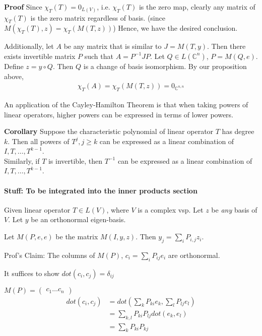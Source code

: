 \documentclass{article}
\begin{document}
\textbf{Proof} Since $\chi_T(T)=0_{L(V)}$, i.e. $\chi_T(T)$ is the zero map, clearly any matrix of $\chi_T(T)$ is the zero matrix regardless of basis. (since $M(\chi_T(T), z) = \chi_T(M(T, z))$) Hence, we have the desired conclusion.

Additionally, let $A$ be any matrix that is similar to $J=M(T, y)$. Then there exists invertible matrix $P$ such that $A=P^{-1}JP$. Let $Q\in L(\mathbb{C}^n)$, $P=M(Q, e)$. Define $z=y\circ Q$. Then $Q$ is a change of basis isomorphism. By our proposition above,
\begin{align*}
	\chi_T(A) = \chi_T(M(T,z)) = 0_{\mathbb{C}^{n,n}}
\end{align*}

An application of the Cayley-Hamilton Theorem is that when taking powers of linear operators, higher powers can be expressed in terms of lower powers.

\textbf{Corollary} Suppose the characteristic polynomial of linear operator $T$ has degree $k$. Then all powers of $T^j, j\geq k$ can be expressed as a linear combination of $I, T, \dots, T^{k-1}$.\\
Similarly, if $T$ is invertible, then $T^{-1}$ can be expressed as a linear combination of $I, T, \dots, T^{k-1}$.




\paragraph{Stuff: To be integrated into the inner products section}

Given linear operator $T\in L(V)$, where $V$ is a complex vsp. Let $z$ be \textit{any} basis of $V$. Let $y$ be an orthonormal eigen-basis.

Let $M(P, e, e)$ be the matrix $M(I, y, z)$.
Then $y_j = \sum_{i}P_{i,j}z_i$.

Prof's Claim: The columns of $M(P)$, $c_i=\sum_{i}P_{ij}e_i$ are orthonormal.

It suffices to show $dot(c_i, c_j)=\delta_{ij}$

$M(P)=\begin{pmatrix}
c_1 \dots c_n
\end{pmatrix}
$
\begin{align*}
dot(c_i, c_j) &= dot(\sum_kP_{ki}e_k,\sum_lP_{lj}e_l)\\
&=\sum_{k,l}P_{ki}P_{lj}dot(e_k,e_l)\\
&=
\sum_{k}P_{ki}P_{kj}
\end{align*}
\end{document}
